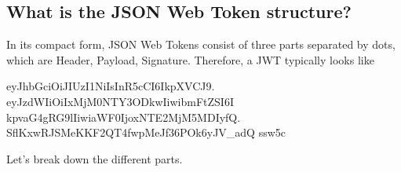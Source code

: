 \subsection{What is the JSON Web Token structure?}\label{subsec:what-is-the-json-web-token-structure?}
In its compact form, JSON Web Tokens consist of three parts separated by dots, which are Header, Payload, Signature.
Therefore, a JWT typically looks like
\begin{center}
    \begin{spverbatim}
        eyJhbGciOiJIUzI1NiIsInR5cCI6IkpXVCJ9.
        eyJzdWIiOiIxMjM0NTY3ODkwIiwibmFtZSI6I
        kpvaG4gRG9lIiwiaWF0IjoxNTE2MjM5MDIyfQ.
        SflKxwRJSMeKKF2QT4fwpMeJf36POk6yJV_adQ
        ssw5c
    \end{spverbatim}
\end{center}
Let's break down the different parts.
